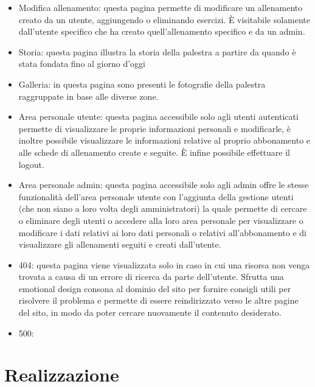 \documentclass[a4paper]{article}
\begin{document}
\begin{itemize}
		\item Modifica allenamento: questa pagina permette di modificare un allenamento creato da un utente, aggiungendo o eliminando esercizi. È visitabile solamente dall'utente specifico che ha creato quell'allenamento specifico e da un admin.
		\item Storia: questa pagina illustra la storia della palestra a partire da quando è stata fondata fino al giorno d'oggi
		\item Galleria: in questa pagina sono presenti le fotografie della palestra raggruppate in base alle diverse zone.
		\item Area personale utente: questa pagina accessibile solo agli utenti autenticati permette di visualizzare le proprie informazioni personali e modificarle, è inoltre possibile visualizzare le informazioni relative al proprio abbonamento e alle schede di allenamento create e seguite. È infine possibile effettuare il logout.
		\item Area personale admin: questa pagina accessibile solo agli admin offre le stesse funzionalità dell'area personale utente con l'aggiunta della gestione utenti (che non siano a loro volta degli amministratori) la quale permette di cercare o eliminare degli utenti o accedere alla loro area personale per visualizzare o modificare i dati relativi ai loro dati personali o relativi all'abbonamento e di visualizzare gli allenamenti seguiti e creati dall'utente.
		\item 404: questa pagina viene visualizzata solo in caso in cui una risorsa non venga trovata a causa di un errore di ricerca da parte dell'utente. Sfrutta una emotional design consona al dominio del sito per fornire consigli utili per risolvere il problema e permette di essere reindirizzato verso le altre pagine del sito, in modo da poter cercare nuovamente il contenuto desiderato.
		\item 500:
	\end{itemize}

	\section{Realizzazione}
\end{document}
